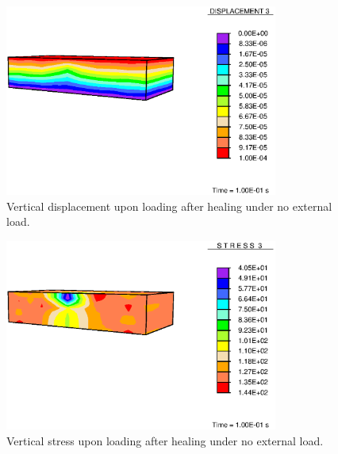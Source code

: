 \begin{figure}[!hpt]
\centering
\includegraphics[width=0.8\textwidth]
                {images/examples/lagrangian/healing/healed-vertical-displacement} 
\caption{Vertical displacement upon loading after healing under no external load.}
\label{healing-vertical-displacement}
\end{figure}

\begin{figure}[!hpt]
\centering
\includegraphics[width=0.8\textwidth]
                {images/examples/lagrangian/healing/healed-vertical-stress} 
\caption{Vertical stress upon loading after healing under no external load.}
\label{healing-vertical-stress}
\end{figure}

%

